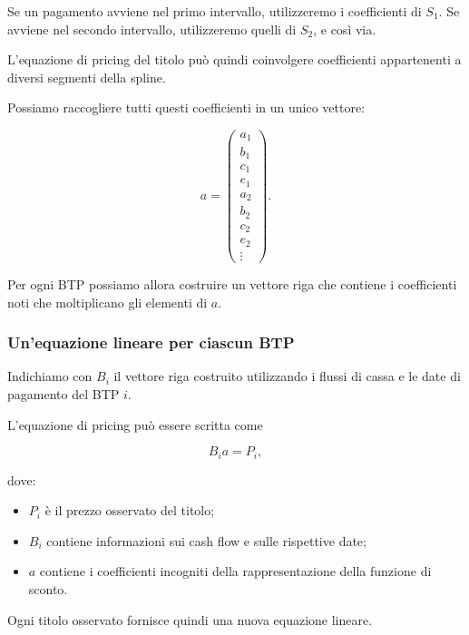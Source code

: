 Se un pagamento avviene nel primo intervallo, utilizzeremo i
coefficienti di $S_1$. Se avviene nel secondo intervallo,
utilizzeremo quelli di $S_2$, e così via.

L'equazione di pricing del titolo può quindi coinvolgere
coefficienti appartenenti a diversi segmenti della spline.

Possiamo raccogliere tutti questi coefficienti in un unico vettore:

\begin{equation*}
a=
\begin{pmatrix}
a_1\\
b_1\\
c_1\\
e_1\\
a_2\\
b_2\\
c_2\\
e_2\\
\vdots
\end{pmatrix}.
\label{eq:spline-coefficient-vector-finance}
\end{equation*}

Per ogni BTP possiamo allora costruire un vettore riga che contiene
i coefficienti noti che moltiplicano gli elementi di $a$.


\subsubsection{Un'equazione lineare per ciascun BTP}

Indichiamo con $B_i$ il vettore riga costruito utilizzando i flussi
di cassa e le date di pagamento del BTP $i$.

L'equazione di pricing può essere scritta come

\begin{equation*}
    B_i a=P_i,
    \label{eq:single-btp-linear}
\end{equation*}

dove:

\begin{itemize}
    \item $P_i$ è il prezzo osservato del titolo;
    \item $B_i$ contiene informazioni sui cash flow e sulle
          rispettive date;
    \item $a$ contiene i coefficienti incogniti della
          rappresentazione della funzione di sconto.
\end{itemize}

Ogni titolo osservato fornisce quindi una nuova equazione lineare.


